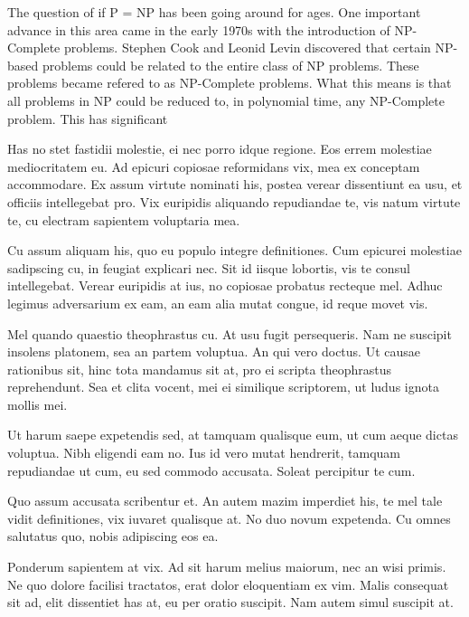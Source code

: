 \documentclass[9pt]{extarticle} %
\begin{document}
%
%
\begin{minipage}[t]{.61\linewidth} %
\vspace{-0.4cm}
\hypertarget{firstnews}{}

The question of if P = NP has been going around for ages. One important advance in this area came in
the early 1970s with the introduction of NP-Complete problems. Stephen Cook and Leonid Levin
discovered that certain NP-based problems could be related to the entire class of NP problems. These
problems became refered to as NP-Complete problems. What this means is that all problems in NP could
be reduced to, in polynomial time, any NP-Complete problem. This has significant 


\hypertarget{secondnews}{} 

Has no stet fastidii molestie, ei nec porro idque regione. Eos errem molestiae mediocritatem eu. Ad epicuri copiosae reformidans vix, mea ex conceptam accommodare. Ex assum virtute nominati his, postea verear dissentiunt ea usu, et officiis intellegebat pro. Vix euripidis aliquando repudiandae te, vis natum virtute te, cu electram sapientem voluptaria mea.

Cu assum aliquam his, quo eu populo integre definitiones. Cum epicurei molestiae sadipscing cu, in feugiat explicari nec. Sit id iisque lobortis, vis te consul intellegebat. Verear euripidis at ius, no copiosae probatus recteque mel. Adhuc legimus adversarium ex eam, an eam alia mutat congue, id reque movet vis.

\hypertarget{thirdnews}{} 

Mel quando quaestio theophrastus cu. At usu fugit persequeris. Nam ne suscipit insolens platonem, sea an partem voluptua. An qui vero doctus. Ut causae rationibus sit, hinc tota mandamus sit at, pro ei scripta theophrastus reprehendunt. Sea et clita vocent, mei ei similique scriptorem, ut ludus ignota mollis mei.

Ut harum saepe expetendis sed, at tamquam qualisque eum, ut cum aeque dictas voluptua. Nibh eligendi eam no. Ius id vero mutat hendrerit, tamquam repudiandae ut cum, eu sed commodo accusata. Soleat percipitur te cum.

Quo assum accusata scribentur et. An autem mazim imperdiet his, te mel tale vidit definitiones, vix iuvaret qualisque at. No duo novum expetenda. Cu omnes salutatus quo, nobis adipiscing eos ea.

Ponderum sapientem at vix. Ad sit harum melius maiorum, nec an wisi primis. Ne quo dolore facilisi tractatos, erat dolor eloquentiam ex vim. Malis consequat sit ad, elit dissentiet has at, eu per oratio suscipit. Nam autem simul suscipit at.

\end{minipage} %
\end{document}
